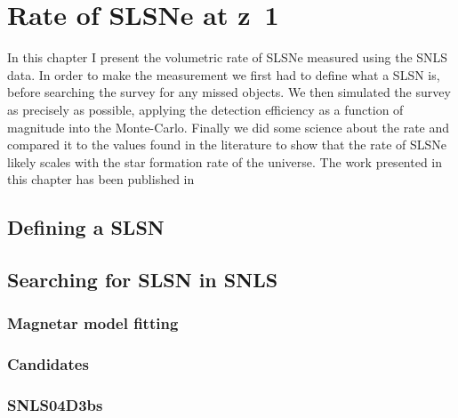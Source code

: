 
\chapter{Rate of SLSNe at z~1} %
\label{Chapter3}


In this chapter I present the volumetric rate of SLSNe measured using the SNLS data. In order to make the measurement we first had to define what a SLSN is, before searching the survey for any missed objects. We then simulated the survey as precisely as possible, applying the detection efficiency as a function of magnitude into the Monte-Carlo. Finally we did some science about the rate and compared it to the values found in the literature to show that the rate of SLSNe likely scales with the star formation rate of the universe. The work presented in this chapter has been published in \citet{Prajs2016}

\section{Defining a SLSN}

\section{Searching for SLSN in SNLS}
\subsection{Magnetar model fitting}
\subsection{Candidates}
\subsection{SNLS04D3bs}

\subsection{}